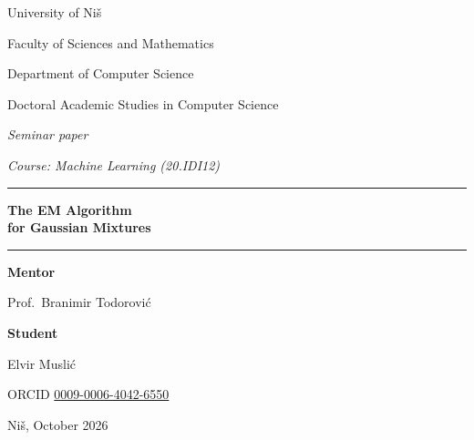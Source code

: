 \documentclass[11pt,a4paper]{amsart}
\numberwithin{equation}{section}
\theoremstyle{plain}
\theoremstyle{definition}
\theoremstyle{remark}
\begin{document}
\thispagestyle{empty}
\begin{center}
  {\large University of Niš\par}
  {\large Faculty of Sciences and Mathematics\par}
  \smallskip
  Department of Computer Science\par
  Doctoral Academic Studies in Computer Science\par

  \vspace{3em}
  {\itshape Seminar paper\par}
  {\itshape Course: Machine Learning (20.IDI12)\par}

  \vspace{3.5em}
  \rule{\linewidth}{0.4pt}\par
  \vspace{1em}
  {\LARGE\bfseries The EM Algorithm\\[0.35em]
    for Gaussian Mixtures\par}
  \vspace{1em}
  \rule{\linewidth}{0.4pt}\par
\end{center}

\vspace{3.5em}
\noindent
\begin{minipage}[t]{0.49\linewidth}
  \raggedright
  \textbf{Mentor}\par
  Prof.\ Branimir Todorović
\end{minipage}\hfill
\begin{minipage}[t]{0.49\linewidth}
  \raggedleft
  \textbf{Student}\par
  Elvir Muslić\,\par
  ORCID \href{https://orcid.org/0009-0006-4042-6550}{0009-0006-4042-6550}
\end{minipage}

\vfill
\begin{center}Niš, October 2026\end{center}
\newpage
\end{document}
